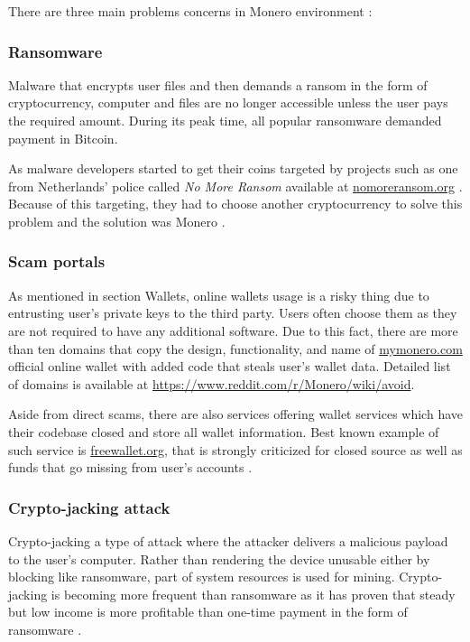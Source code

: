 \documentclass[
  printed, %
  table,   %
  nolof,     %
  nolot,     %
           oneside, color
]{fithesis3}
\begin{document}
There are three main problems concerns in Monero environment :
\subsubsection{Ransomware}
Malware that encrypts user files and then demands a ransom in the form of cryptocurrency, computer and files are no longer accessible unless the user pays the required amount. During its peak time, all popular ransomware demanded payment in Bitcoin. 

As malware developers started to get their coins targeted by projects such as one from Netherlands' police called \textit{No More Ransom} available at \url{nomoreransom.org} \cite{martin2017don,paquet2018ransomware}. 
Because of this targeting, they had to choose another cryptocurrency to solve this problem and the solution was Monero \cite{cusack2018points}.

\subsubsection{Scam portals}
As mentioned in section Wallets, online wallets usage is a risky thing due to entrusting user's private keys to the third party. Users often choose them as they are not required to have any additional software. Due to this fact, there are more than ten domains that copy the design, functionality, and name of \url{mymonero.com} official online wallet with added code that steals user's wallet data. Detailed list of domains is available at \url{https://www.reddit.com/r/Monero/wiki/avoid}.

Aside from direct scams, there are also services offering wallet services which have their codebase closed and store all wallet information. Best known example of such service is \url{freewallet.org}, that is strongly criticized for closed source as well as funds that go missing from user's accounts \cite{wijayamonero}.
\subsubsection{Crypto-jacking attack}
Crypto-jacking a type of attack where the attacker delivers a malicious payload to the user's computer. Rather than rendering the device unusable either by blocking like ransomware, part of system resources is used for mining.
Crypto-jacking is becoming more frequent than ransomware as it has proven that steady but low income is more profitable than one-time payment in the form of ransomware \cite{higbee2018role}.
\vspace{-1em}
\end{document}
